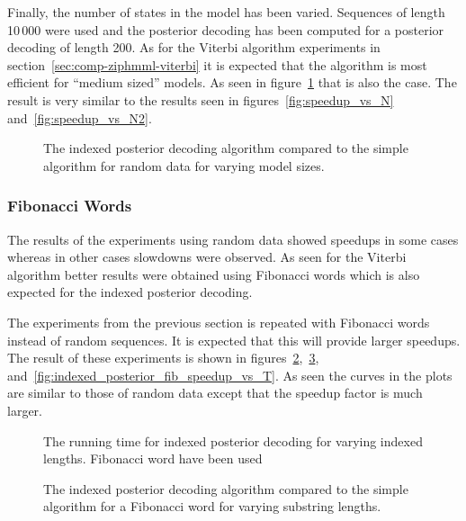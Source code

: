 Finally, the number of states in the model has been varied. Sequences of length
10\,000 were used and the posterior decoding has been computed for a posterior decoding of
length 200. As for the Viterbi algorithm experiments in
section~\ref{sec:comp-ziphmml-viterbi} it is expected that the algorithm is
most efficient for ``medium sized'' models. As seen in
figure~\ref{fig:indexed_posterior_speedup_vs_N} that is also the case. The
result is very similar to the results seen in figures~\ref{fig:speedup_vs_N}
and~\ref{fig:speedup_vs_N2}.

\begin{figure}
  \centering
  
  \caption{The indexed posterior decoding algorithm compared to the simple
    algorithm for random data for varying model sizes.}
  \label{fig:indexed_posterior_speedup_vs_N}
\end{figure}

\subsubsection{Fibonacci Words}

The results of the experiments using random data showed speedups in some cases
whereas in other cases slowdowns were observed. As seen for the Viterbi
algorithm better results were obtained using Fibonacci words which
is also expected for the indexed posterior decoding.

The experiments from the previous section is repeated with Fibonacci words
instead of random sequences. It is expected that this will provide larger
speedups. The result of these experiments is shown in
figures~\ref{fig:assymptotic_indexed_posterior_fib_subseq_length.tex},~\ref{fig:fib_indexed_posterior_speedup_vs_subseq},
and~\ref{fig:indexed_posterior_fib_speedup_vs_T}. As seen the curves in the
plots are similar to those of random data except that the speedup factor is
much larger.

\begin{figure}
  \centering
  
  \caption{The running time for indexed posterior decoding for
    varying indexed lengths. Fibonacci word have been used}
  \label{fig:assymptotic_indexed_posterior_fib_subseq_length.tex}
\end{figure}

\begin{figure}
  \centering
  
  \caption{The indexed posterior decoding algorithm compared to the simple
    algorithm for a Fibonacci word for varying substring lengths.}
  \label{fig:fib_indexed_posterior_speedup_vs_subseq}
\end{figure}

